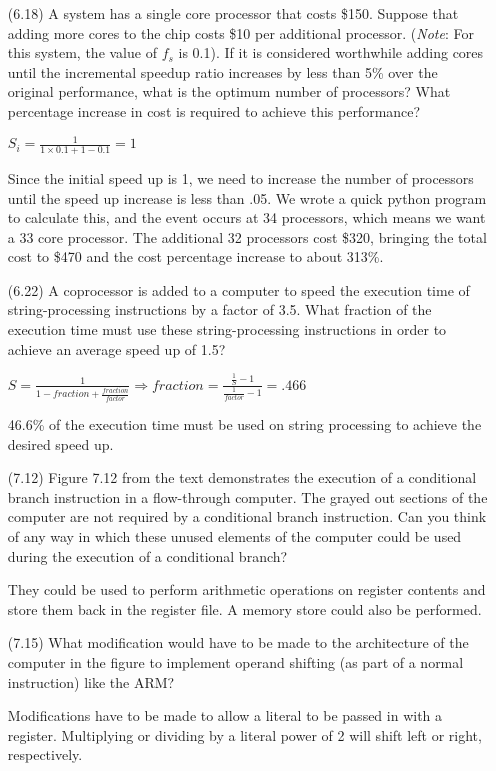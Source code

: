 \documentclass[letterpaper,10pt,titlepage]{article}
\begin{document}
\begin{enumerate}
	\item[(6.18)] A system has a single core processor that costs \$150. Suppose that
		adding more cores to the chip costs \$10 per additional processor.
		(\textit{Note}: For this system, the value of $f_{s}$ is 0.1). If it is
		considered worthwhile adding cores until the incremental speedup ratio
		increases by less than 5\% over the original performance, what is the
		optimum number of processors? What percentage increase in cost is required
		to achieve this performance?
	\item[\textbullet] $S_{i} = \frac{1}{1\times0.1+1-0.1} = 1$
	\item[\textbullet] Since the initial speed up is 1, we need to increase the number
		of processors until the speed up increase is less than .05. We wrote a
		quick python program to calculate this, and the event occurs at 34
		processors, which means we want a 33 core processor. The additional 32
		processors cost \$320, bringing the total cost to \$470 and the cost
		percentage increase to about 313\%.

	\item[(6.22)] A coprocessor is added to a computer to speed the execution time of
		string-processing instructions by a factor of 3.5. What fraction of the
		execution time must use these string-processing instructions in order to
		achieve an average speed up of 1.5?
	\item[\textbullet] $S = \frac{1}{1-fraction+\frac{fraction}{factor}} \Rightarrow
		fraction = \frac{\frac{1}{S}-1}{\frac{1}{factor}-1} = .466$
	\item[\textbullet] 46.6\% of the execution time must be used on string processing
		to achieve the desired speed up.

	\item[(7.12)] Figure 7.12 from the text demonstrates the execution of a
		conditional branch instruction in a flow-through computer. The grayed out
		sections of the computer are not required by a conditional branch
		instruction. Can you think of any way in which these unused elements of the
		computer could be used during the execution of a conditional branch?
	\item[\textbullet] They could be used to perform arithmetic operations on register
		contents and store them back in the register file. A memory store could
		also be performed.

	\item[(7.15)] What modification would have to be made to the architecture of the
		computer in the figure to implement operand shifting (as part of a normal
		instruction) like the ARM?
	\item[\textbullet] Modifications have to be made to allow a literal to be passed
		in with a register. Multiplying or dividing by a literal power of 2 will
		shift left or right, respectively.

\end{enumerate}
\end{document}
